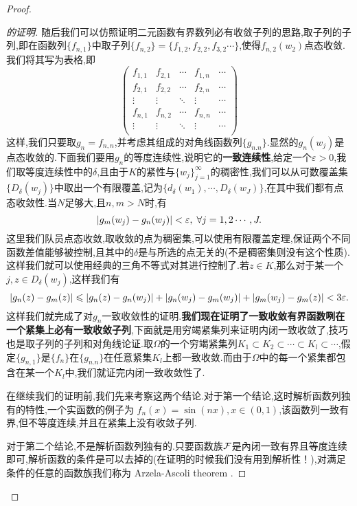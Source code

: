 \begin{proof}
\begin{proof}[的证明]
  随后我们可以仿照证明二元函数有界数列必有收敛子列的思路,取子列的子列,即在函数列$\{f_{n,1}\}$中取子列$\{f_{n,2}\}=\{f_{1,2},f_{2,2},f_{3,2}\cdots\}$,使得$f_{n,2}(w_2)$点态收敛.我们将其写为表格,即
  \begin{equation}
    \begin{pmatrix}
      f_{1,1}&f_{2,1}&\cdots &f_{1,n}&\cdots\\
f_{2,1}&f_{2,2}&\cdots &f_{2,n}&\cdots\\
\vdots &\vdots &\ddots &\vdots &\cdots\\
f_{n,1}&f_{n,2}&\cdots &f_{n,n}&\cdots\\
\vdots &\vdots &\ddots &\vdots &\cdots\\
    \end{pmatrix}
  \end{equation}
  这样,我们只要取$g_n=f_{n,n}$,并考虑其组成的对角线函数列$\{g_{n.n}\}$.显然的$g_n (w_j)$是点态收敛的.下面我们要用$g_n$的等度连续性,说明它的\textbf{一致连续性},给定一个$\varepsilon>0$,我们取等度连续性中的$\delta$,且由于$K$的紧性与$\{w_j\}_{j=1}^\infty$的稠密性,我们可以从可数覆盖集$\{D_\delta (w_j)\}$中取出一个有限覆盖,记为$\{d_\delta (w_1),\cdots,D_\delta (w_J)\}$,在其中我们都有点态收敛性.当$N$足够大,且$n,m>N$时,有
  \[\abs{g_m (w_j)- g_n (w_j)}<\varepsilon,\; \forall j=1,2\cdots,J.\]
  这里我们队员点态收敛,取收敛的点为稠密集,可以使用有限覆盖定理,保证两个不同函数差值能够被控制,且其中的$\delta$是与所选的点无关的(不是稠密集则没有这个性质).这样我们就可以使用经典的三角不等式对其进行控制了.若$z\in K$,那么对于某一个$j,z\in D_\delta (w_j)$,这样我们有
  \[\abs{g_n (z)-g_m (z)}\leqslant \abs{g_n (z)-g_n (w_j)}+\abs{g_n (w_j)-g_m (w_j)}+\abs{g_m (w_j)-g_m (z)}<3\varepsilon.\]
  这样我们就完成了对$g_n$一致收敛性的证明.\textbf{我们现在证明了一致收敛有界函数咧在一个紧集上必有一致收敛子列},下面就是用穷竭紧集列来证明内闭一致收敛了,技巧也是取子列的子列和对角线论证.取$\Omega$的一个穷竭紧集列$K_1\subset K_2 \subset \cdots \subset K_l\subset \cdots$,假定$\{g_{n,1}\}$是$\{f_n\}$在$\{g_{n.n}\}$在任意紧集$K_l$上都一致收敛.而由于$\Omega$中的每一个紧集都包含在某一个$K_l$中,我们就证完内闭一致收敛性了.

  在继续我们的证明前,我们先来考察这两个结论.对于第一个结论,这时解析函数列独有的特性,一个实函数的例子为 $f_n (x)=\sin (nx),x\in (0,1)$,该函数列一致有界,但不等度连续,并且在紧集上没有收敛子列.

对于第二个结论,不是解析函数列独有的.只要函数族$\mathcal{F}$是內闭一致有界且等度连续即可,解析函数的条件是可以去掉的(在证明的时候我们没有用到解析性！),对满足条件的任意的函数族我们称为 Arzela-Ascoli theorem .


\end{proof}
\end{proof}

